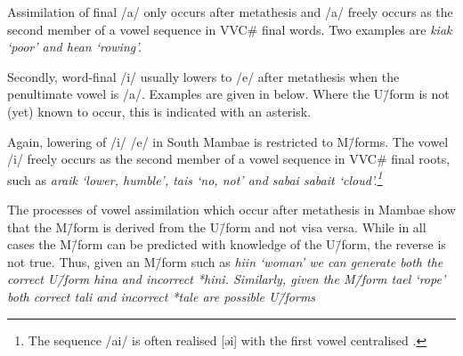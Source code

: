 Assimilation of final /a/ only occurs after
metathesis and /a/ freely occurs as the second
member of a vowel sequence in VVC{\#} final words.
Two examples are \it{kiak} `poor' and \it{hean} `rowing'.

Secondly, word-final /i/ usually lowers to /e/ after metathesis
when the penultimate vowel is /a/.
Examples are given in  below.
Where the U\=/form is not (yet) known to occur,
this is indicated with an asterisk.

\begin{exe}
	\label{ex:aCi->aeC-Mam}
\end{exe}

Again, lowering of /i/ {\ra} /e/ in South Mambae
is restricted to M\=/forms.
The vowel /i/ freely occurs as the
second member of a vowel sequence in VVC{\#}
final roots, such as \it{araik} `lower, humble',
\it{tais} `no, not' and \it{sabai} {\tl} \it{sabait} `cloud'.\footnote{
		The sequence /ai/ is often realised [əi]
		with the first vowel centralised \citep[6]{gr14}.}

The processes of vowel assimilation which
occur after metathesis in Mambae show
that the M\=/form is derived from the U\=/form and not visa versa.
While in all cases the M\=/form can be predicted
with knowledge of the U\=/form, the reverse is not true.
Thus, given an M\=/form such as \it{hiin} `woman'
we can generate both the correct U\=/form \it{hina}
and incorrect \it{*hini}. Similarly, given the
M\=/form \it{tael} `rope' both correct \it{tali}
and incorrect \it{*tale} are possible U\=/forms

